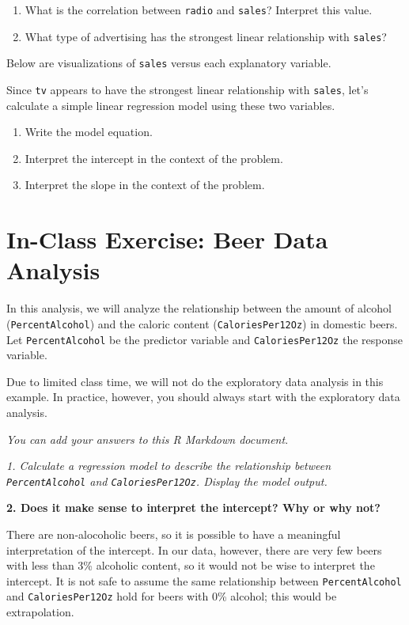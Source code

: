 \documentclass[]{book}
\begin{document}
\begin{enumerate}
\def\labelenumi{\arabic{enumi}.}
\item
  What is the correlation between \texttt{radio} and \texttt{sales}?
  Interpret this value.
\item
  What type of advertising has the strongest linear relationship with
  \texttt{sales}?
\end{enumerate}

Below are visualizations of \texttt{sales} versus each explanatory
variable.

Since \texttt{tv} appears to have the strongest linear relationship with
\texttt{sales}, let's calculate a simple linear regression model using
these two variables.

\begin{enumerate}
\def\labelenumi{\arabic{enumi}.}
\item
  Write the model equation.
\item
  Interpret the intercept in the context of the problem.
\item
  Interpret the slope in the context of the problem.
\end{enumerate}

\section{In-Class Exercise: Beer Data
Analysis}\label{in-class-exercise-beer-data-analysis}

In this analysis, we will analyze the relationship between the amount of
alcohol (\texttt{PercentAlcohol}) and the caloric content
(\texttt{CaloriesPer12Oz}) in domestic beers. Let
\texttt{PercentAlcohol} be the predictor variable and
\texttt{CaloriesPer12Oz} the response variable.

Due to limited class time, we will not do the exploratory data analysis
in this example. In practice, however, you should always start with the
exploratory data analysis.

\emph{You can add your answers to this R Markdown document}.

\emph{1. Calculate a regression model to describe the relationship
between \texttt{PercentAlcohol} and \texttt{CaloriesPer12Oz}. Display
the model output.}

\textbf{2. Does it make sense to interpret the intercept? Why or why
not?}

There are non-alocoholic beers, so it is possible to have a meaningful
interpretation of the intercept. In our data, however, there are very
few beers with less than 3\% alcoholic content, so it would not be wise
to interpret the intercept. It is not safe to assume the same
relationship between \texttt{PercentAlcohol} and
\texttt{CaloriesPer12Oz} hold for beers with 0\% alcohol; this would be
extrapolation.
\end{document}
